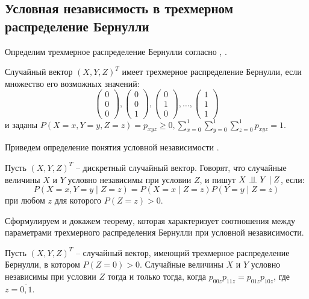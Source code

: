 \subsection{Условная независимость в трехмерном распределение Бернулли}\label{ci_and_bernoulli}
Определим трехмерное распределение Бернулли согласно \cite{Dai2013}, \cite{Teugels1990}.
\begin{definition}
    Случайный вектор $(X,Y,Z)^T$ имеет трехмерное распределение Бернулли,
    если множество его возможных значений:
    $$
        \begin{pmatrix}
            0 \\
            0 \\
            0
        \end{pmatrix},
        \begin{pmatrix}
            0 \\
            0 \\
            1
        \end{pmatrix},
        \begin{pmatrix}
            0 \\
            1 \\
            0
        \end{pmatrix}, \ldots, \begin{pmatrix}
            1 \\
            1 \\
            1
        \end{pmatrix}
    $$ и заданы $P(X=x,Y=y,Z=z)=p_{xyz} \geq 0,  \sum_{x=0}^1 \sum_{y=0}^1 \sum_{z=0}^1 p_{xyz} =1$.
\end{definition}
Приведем определение понятия условной независимости \cite{Lauritzen1996}.
\begin{definition}
    Пусть $(X,Y,Z)^T$ -- дискретный случайный вектор.
    Говорят, что случайные величины $X$ и $Y$ условно независимы при условии $Z$,
    и пишут $X \perp\!\!\!\perp Y \mid Z$, если:
    $$
    P(X=x, Y=y \mid Z = z) = P(X=x \mid Z = z) P(Y=y \mid Z = z)
    $$
    при любом $z$ для которого $P(Z=z)>0$.
\end{definition}
Сформулируем и докажем теорему, которая характеризует соотношения между параметрами трехмерного распределения Бернулли при условной независимости.
\begin{theorem}\label{thm1}
    Пусть $(X,Y,Z)^T$ -- случайный вектор, имеющий трехмерное распределение Бернулли, в котором $P(Z=0)>0$.
    Случайные величины $X$ и $Y$ условно независимы при условии $Z$ тогда и только тогда, когда
    $p_{00z}p_{11z}=p_{01z}p_{10z}$, где $z=\overline{0,1}$.
\end{theorem}
